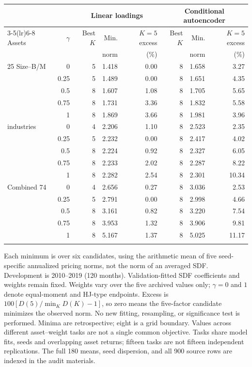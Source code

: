 \begin{widetable}[!tbp]
\centering\footnotesize
\caption{Complete asset--weight audit of the archived conditional-autoencoder extension}
\label{tab:cae-surface-audit}
\begin{threeparttable}
\begin{tabular}{@{}lrrrrrrr@{}}
\toprule & & \multicolumn{3}{c}{Linear loadings} & \multicolumn{3}{c}{Conditional autoencoder} \\
\cmidrule(lr){3-5}\cmidrule(lr){6-8}
Assets & $\gamma$ & Best $K$ & Min. & $K=5$ excess & Best $K$ & Min. & $K=5$ excess \\
 & & & norm & (\%) & & norm & (\%) \\ \midrule
25 Size--B/M & 0 & 5 & 1.418 & 0.00 & 8 & 1.658 & 3.27 \\
 & 0.25 & 5 & 1.489 & 0.00 & 8 & 1.651 & 4.35 \\
 & 0.5 & 8 & 1.607 & 1.08 & 8 & 1.705 & 5.65 \\
 & 0.75 & 8 & 1.731 & 3.36 & 8 & 1.832 & 5.58 \\
 & 1 & 8 & 1.869 & 3.66 & 8 & 1.981 & 3.96 \\
\addlinespace[3pt]
49 industries & 0 & 4 & 2.206 & 1.10 & 8 & 2.523 & 2.35 \\
 & 0.25 & 5 & 2.232 & 0.00 & 8 & 2.417 & 4.02 \\
 & 0.5 & 8 & 2.224 & 0.92 & 8 & 2.327 & 6.05 \\
 & 0.75 & 8 & 2.233 & 2.02 & 8 & 2.287 & 8.22 \\
 & 1 & 8 & 2.282 & 2.54 & 8 & 2.301 & 10.34 \\
\addlinespace[3pt]
Combined 74 & 0 & 4 & 2.656 & 0.27 & 8 & 3.036 & 2.53 \\
 & 0.25 & 5 & 2.791 & 0.00 & 8 & 2.998 & 4.66 \\
 & 0.5 & 8 & 3.161 & 0.82 & 8 & 3.220 & 7.54 \\
 & 0.75 & 8 & 3.953 & 1.32 & 8 & 3.906 & 9.81 \\
 & 1 & 8 & 5.167 & 1.37 & 8 & 5.025 & 11.17 \\
\addlinespace[3pt]
\bottomrule\end{tabular}
\begin{tablenotes}[flushleft]\footnotesize
\item Each minimum is over six candidates, using the arithmetic mean of five seed-specific annualized pricing norms, not the norm of an averaged SDF. Development is 2010--2019 (120 months). Validation-fitted SDF coefficients and weights remain fixed. Weights vary over the five archived values only; $\gamma=0$ and $1$ denote equal-moment and HJ-type endpoints. Excess is $100[D(5)/\min_K D(K)-1]$, so zero means the five-factor candidate minimizes the observed norm. No new fitting, resampling, or significance test is performed. Minima are retrospective; eight is a grid boundary. Values across different asset--weight tasks are not a single common objective. Tasks share model fits, seeds and overlapping asset returns; fifteen tasks are not fifteen independent replications. The full 180 means, seed dispersion, and all 900 source rows are indexed in the audit materials.
\end{tablenotes}\end{threeparttable}
\end{widetable}
